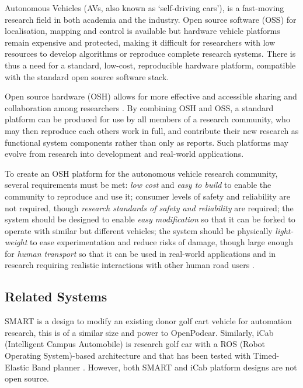 \documentclass[a4paper]{article}
\begin{document}
	Autonomous Vehicles (AVs, also known as `self-driving cars'), is a fast-moving research field in both academia and the industry. Open source software (OSS) for localisation, mapping and control is available \cite{kato2018autoware} but hardware vehicle platforms remain expensive and protected, making it difficult for researchers with low resources to develop algorithms or reproduce complete research systems. There is thus a need for a standard, low-cost, reproducible hardware platform, compatible with the standard open source software stack.
	
	Open source hardware (OSH) allows for more effective and accessible sharing and collaboration among researchers \cite{fisher2012open}. By combining OSH and OSS, a standard platform can be produced for use by all members of a research community, who may then reproduce each others work in full, and contribute their new research as functional system components rather than only as reports. Such platforms may evolve from research into development and real-world applications.
	
	To create an OSH platform for the autonomous vehicle research community, several requirements must be met: {\em low cost} and {\em easy to build} to enable the community to reproduce and use it; consumer levels of safety and reliability are not required, though {\em research standards of safety and reliability} are required; the system should be designed to enable {\em easy modification} so that it can be forked to operate with similar but different vehicles; the system should be physically {\em light-weight} to ease experimentation and reduce risks of damage, though large enough for {\em human transport} so that it can be used in real-world applications and in research requiring realistic interactions with other human road users \cite{camara2021evaluating, delucia2013effects}.
	
	\subsection{Related Systems}
	\label{related_systems}
	
	SMART \cite{pendleton2015autonomous} is a design to modify an existing donor golf cart vehicle for automation research, this is of a similar size and power to OpenPodcar. Similarly, iCab (Intelligent Campus Automobile) \cite{gomez2016ros} is research golf car with a ROS (Robot Operating System)-based architecture and that has been tested with Timed-Elastic Band planner \cite{marin-plaza2018global}. However, both SMART and iCab platform designs are not open source.
	
\end{document}
